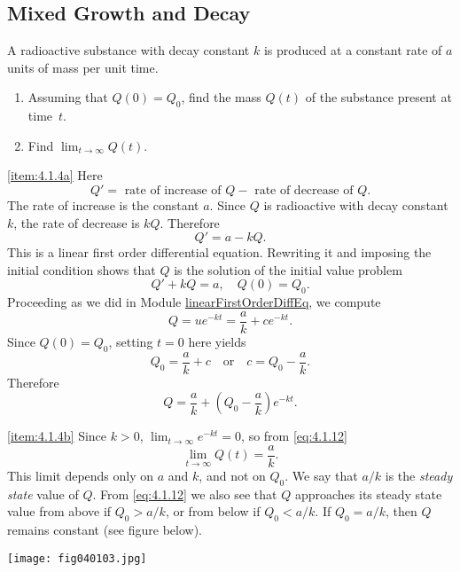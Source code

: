 \documentclass{ximera}
\begin{document}
\subsection*{Mixed Growth and Decay}

\begin{example}\label{example:4.1.4}
A radioactive substance with decay constant $k$ is produced at a
constant rate of $a$ units of mass per unit time.
\begin{enumerate}
\item \label{item:4.1.4a}%
Assuming that $Q(0)=Q_0$, find the mass $Q(t)$ of the
substance present at time~$t$.

\item \label{item:4.1.4b}%
Find $\lim_{t\rightarrow\infty} Q(t)$.
\end{enumerate}
\begin{explanation}
\ref{item:4.1.4a}  Here
$$
Q'=\mbox{ rate of increase of } Q - \mbox{ rate of decrease
of } Q.
$$
The rate of increase is the constant $a$. Since $Q$ is radioactive
with decay constant $k$, the rate of decrease is $kQ$. Therefore
$$
Q'=a-kQ.
$$
This is a linear first order differential equation. Rewriting it and
imposing the initial condition shows that $Q$ is the solution of the
initial value problem
\begin{equation}  \label{eq:4.1.11}
Q'+kQ=a, \quad Q(0)=Q_0.
\end{equation}
Proceeding as we did in Module \href{https://ximera.osu.edu/ode/main/linearFirstOrderDiffEq/linearFirstOrderDiffEq}{linearFirstOrderDiffEq}, we compute $$Q=ue^{-kt}=\frac{a}{k}+ce^{-kt}.$$
 Since $Q(0)=Q_0$, setting $t=0$ here yields
$$Q_0=\frac{a}{k}+c  \quad\mbox{or}\quad c=Q_0-\frac{a}{k}.$$
 Therefore
\begin{equation} \label{eq:4.1.12}
Q=\frac{a}{k}+\left(Q_0-\frac{a}{k}\right)e^{-kt}.
\end{equation}

\ref{item:4.1.4b}
Since $k > 0$,  $\lim_{t\rightarrow\infty} e^{-kt}=0$, so
from \eqref{eq:4.1.12}
$$
\lim_{t\rightarrow\infty} Q(t)=\frac{a}{k}.
$$
This limit depends only on $a$ and $k$, and not on $Q_0$.
We say that $a/k$ is the \textit{steady state} value of $Q$. From
\eqref{eq:4.1.12} we also see that $Q$ approaches its steady state value
from above if $Q_0 > a/k$, or from below if $Q_0 < a/k$. If $Q_0=a/k$,
then $Q$ remains constant (see figure below).

\begin{image}
 \texttt{[image: fig040103.jpg]} 
 \end{image}

\end{explanation}
\end{example}
\end{document}
